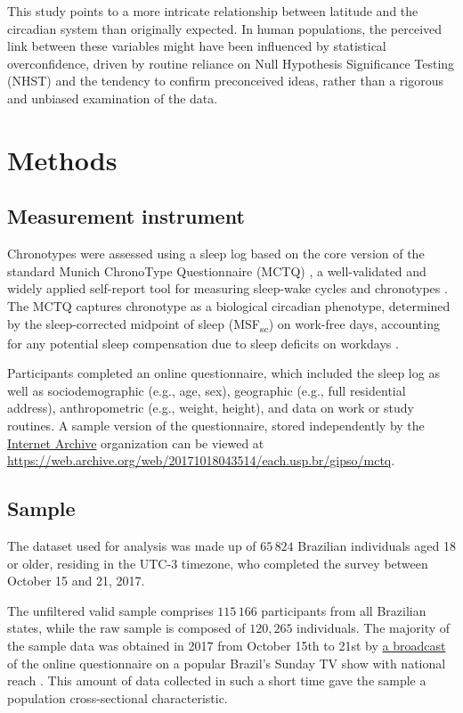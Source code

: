 \documentclass[
12pt,
openright,
oneside,
a4paper,
chapter=TITLE,
section=TITLE,
french,
spanish,
brazil,
english
]{abntex2}\usepackage{array}
\begin{document}
This study points to a more intricate relationship between latitude and
the circadian system than originally expected. In human populations, the
perceived link between these variables might have been influenced by
statistical overconfidence, driven by routine reliance on Null
Hypothesis Significance Testing (NHST) and the tendency to confirm
preconceived ideas, rather than a rigorous and unbiased examination of
the data.

\section{Methods}\label{methods}

\subsection{Measurement instrument}\label{measurement-instrument}

Chronotypes were assessed using a sleep log based on the core version of
the standard Munich ChronoType Questionnaire (MCTQ)
\autocite{roenneberg2003}, a well-validated and widely applied
self-report tool for measuring sleep-wake cycles and chronotypes
\autocite{roenneberg2019}. The MCTQ captures chronotype as a biological
circadian phenotype, determined by the sleep-corrected midpoint of sleep
(MSF\textsubscript{sc}) on work-free days, accounting for any potential
sleep compensation due to sleep deficits on workdays
\autocite{roenneberg2012}.

Participants completed an online questionnaire, which included the sleep
log as well as sociodemographic (e.g., age, sex), geographic (e.g., full
residential address), anthropometric (e.g., weight, height), and data on
work or study routines. A sample version of the questionnaire, stored
independently by the \href{https://archive.org/}{Internet Archive}
organization can be viewed at
\url{https://web.archive.org/web/20171018043514/each.usp.br/gipso/mctq}.

\subsection{Sample}\label{sample}

The dataset used for analysis was made up of \(65\,824\) Brazilian
individuals aged 18 or older, residing in the UTC-3 timezone, who
completed the survey between October 15 and 21, 2017.

The unfiltered valid sample comprises \(115\,166\) participants from all
Brazilian states, while the raw sample is composed of \(120,265\)
individuals. The majority of the sample data was obtained in 2017 from
October 15th to 21st by \href{https://globoplay.globo.com/v/6219513/}{a
broadcast} of the online questionnaire on a popular Brazil's Sunday TV
show with national reach \autocite{redeglobo2017}. This amount of data
collected in such a short time gave the sample a population
cross-sectional characteristic.
\end{document}
